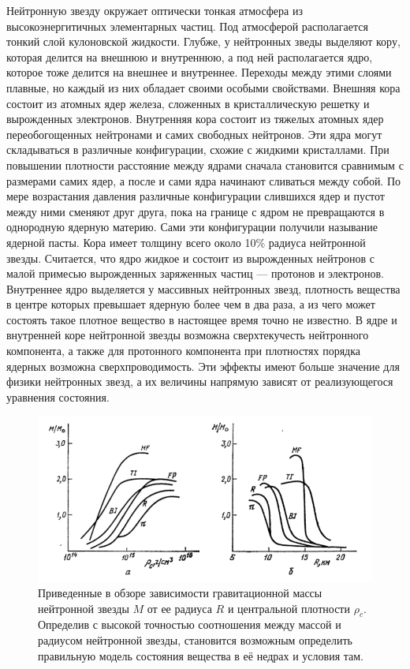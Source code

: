 \documentclass[14pt,a4paper]{extarticle}
\begin{document}
			Нейтронную звезду окружает оптически тонкая атмосфера из высокоэнергитичных элементарных частиц. Под атмосферой располагается тонкий слой кулоновской жидкости. 
			Глубже, у нейтронных зведы выделяют кору, которая делится на внешнюю и внутреннюю, 
			а под ней располагается ядро, которое тоже делится на внешнее и внутреннее.
			Переходы между этими слоями плавные, но каждый из них обладает своими особыми свойствами.
			Внешняя кора состоит из атомных ядер железа, сложенных в кристаллическую решетку и вырожденных электронов. 
			Внутренняя кора состоит из тяжелых атомных ядер переобогощенных нейтронами и самих свободных нейтронов. 
			Эти ядра могут складываться в различные конфигурации, схожие с жидкими кристаллами. 
			При повышении плотности расстояние между ядрами сначала становится сравнимым с размерами самих ядер, а после и сами ядра начинают сливаться между собой.
			По мере возрастания давления различные конфигурации слившихся ядер и пустот между ними сменяют друг друга, пока на границе с ядром не превращаются в однородную ядерную материю. 
			Сами эти конфигурации получили называние ядерной пасты.
			Кора имеет толщину всего около 10\% радиуса нейтронной звезды.
			Считается, что ядро жидкое и состоит из вырожденных нейтронов с малой примесью вырожденных заряженных частиц --- протонов и электронов.
			Внутреннее ядро выделяется у массивных нейтронных звезд, плотность вещества в центре которых превышает ядерную более чем в два раза, а из чего может состоять такое плотное вещество в настоящее время точно не известно.
			В ядре и внутренней коре нейтронной звезды возможна сверхтекучесть нейтронного компонента, а также для протонного компонента при плотностях порядка ядерных возможна сверхпроводимость. 
			Эти эффекты имеют больше значение для физики нейтронных звезд, а их величины напрямую зависят от реализующегося уравнения состояния.  

			\begin{figure}[H]
				\centering
				\includegraphics[scale=0.6]{B87EOS.png}
				\caption{\small
				Приведенные в обзоре \cite{Beskin1987} зависимости гравитационной массы нейтронной звезды $M$ от ее радиуса $R$  и центральной плотности $\rho_c$. 
				Определив с высокой точностью соотношения между массой и радиусом нейтронной звезды, становится возможным определить правильную модель состояния вещества в её недрах и условия там.}
				\label{B87EOS}
			\end{figure}
\end{document}
